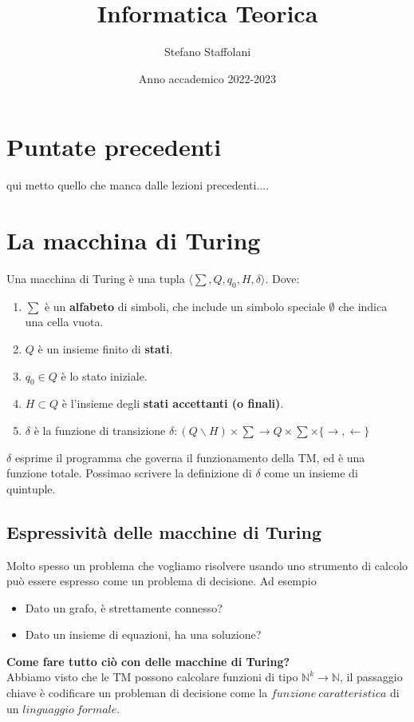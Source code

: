 \documentclass[a4paper, 12pt]{article}
\title{Informatica Teorica}
\author{Stefano Staffolani}
\date{ Anno accademico 2022-2023}
\begin{document}
\maketitle
\tableofcontents
\newpage
\section{Puntate precedenti}
qui metto quello che manca dalle lezioni precedenti....
\section{La macchina di Turing}
Una macchina di Turing \`e una tupla $\langle \sum, Q,q_0,H,\delta\rangle$. Dove: 
\begin{enumerate}
\item $\sum$ \`e un \textbf{alfabeto} di simboli, che include un simbolo speciale $\emptyset$ che indica una cella vuota.
\item $Q$ \`e un insieme finito di \textbf{stati}.
\item $q_0 \in Q$ \`e lo stato iniziale.
\item $H \subset Q$ \`e l'insieme degli \textbf{stati accettanti (o finali)}.
\item $\delta$ \`e la funzione di transizione $\delta: (Q \backslash H) \times \sum \rightarrow Q \times \sum \times \{ \rightarrow, \leftarrow \} $
\end{enumerate}
$\delta$ esprime il programma che governa il funzionamento della TM, ed \`e una funzione totale. Possimao scrivere la definizione di $\delta$ come un insieme di quintuple.
\subsection{Espressivit\`a delle macchine di Turing}
Molto spesso un problema che vogliamo risolvere usando uno strumento di calcolo pu\`o essere espresso come un problema di decisione. Ad esempio\begin{itemize}
\item Dato un grafo, \`e strettamente connesso?
\item Dato un insieme di equazioni, ha una soluzione?
\end{itemize}
\textbf{Come fare tutto ci\`o con delle macchine di Turing?}\\
Abbiamo visto che le TM possono calcolare funzioni di tipo $\mathbb{N}^{k} \rightarrow \mathbb{N}$, il passaggio chiave \`e codificare un probleman di decisione come la $funzione\ caratteristica$ di un $linguaggio\ formale$.
\end{document}
